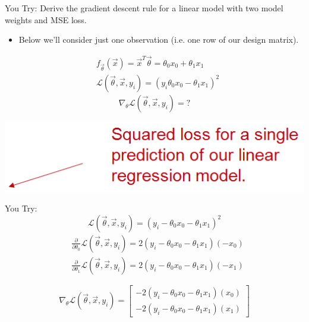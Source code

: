 \documentclass[aspectratio=169]{../latex_main/tntbeamer}  %
\begin{document}
	
	\begin{frame}[c]{You Try:}
	    Derive the gradient descent rule for a linear model with two model weights and MSE loss. 
	    \begin{itemize}
	        \item Below we’ll consider just one observation (i.e. one row of our design matrix).
	    \end{itemize}
	    \begin{align*}
	        &f_{\Vec{\theta}}(\Vec{x}) = \Vec{x}^T\Vec{\theta} = \theta_0x_0 + \theta_1x_1\\
	        & \mathcal{L}(\Vec{\theta}, \Vec{x}, y_i) = (y_i \theta_0x_0 - \theta_1x_1)^2
	    \end{align*}
	    \begin{equation*}
	        \nabla_\theta \mathcal{L}(\Vec{\theta}, \Vec{x}, y_i) = ?
	    \end{equation*}
	    
	    \vspace{-2.5cm}
	    \hspace{10cm} \includegraphics[scale=.3]{Bild27}
	    \vspace{2.5cm}
	\end{frame}
	
	
	
	\begin{frame}[c]{You Try:}
	    \begin{equation*}
	        \mathcal{L}(\Vec{\theta}, \Vec{x}, y_i) = (y_i - \theta_0x_0 - \theta_1x_1)^2
	    \end{equation*}
	    \begin{align*}
	        &\frac{\partial}{\partial\theta_0}\mathcal{L}(\Vec{\theta}, \Vec{x}, y_i) = 2(y_i - \theta_0x_0 - \theta_1x_1)(-x_0)\\
	        &\frac{\partial}{\partial\theta_1}\mathcal{L}(\Vec{\theta}, \Vec{x}, y_i) = 2(y_i - \theta_0x_0 - \theta_1x_1)(-x_1)
	    \end{align*}
	    
	    \hspace{3.3cm}
	    \begin{equation*}
	        \nabla_\theta \mathcal{L}(\Vec{\theta}, \Vec{x}, y_i) = \left[\begin{array}{c}
	             -2(y_i - \theta_0x_0 - \theta_1x_1)(x_0) \\
                 -2(y_i - \theta_0x_0 - \theta_1x_1)(x_1)
	        \end{array}\right]
	    \end{equation*}
	\end{frame}
	
\end{document}
